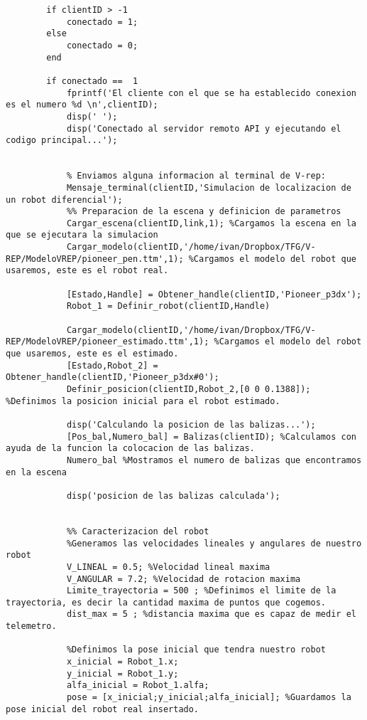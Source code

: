 \begin{lstlisting}[frame=single]
        %Comprobamos si estamos conectados a V-REP
        if clientID > -1 
            conectado = 1;
        else 
            conectado = 0;
        end

        if conectado ==  1
            fprintf('El cliente con el que se ha establecido conexion es el numero %d \n',clientID);
            disp(' ');
            disp('Conectado al servidor remoto API y ejecutando el codigo principal...');
            	

            % Enviamos alguna informacion al terminal de V-rep:
            Mensaje_terminal(clientID,'Simulacion de localizacion de un robot diferencial');
            %% Preparacion de la escena y definicion de parametros
            Cargar_escena(clientID,link,1); %Cargamos la escena en la que se ejecutara la simulacion
            Cargar_modelo(clientID,'/home/ivan/Dropbox/TFG/V-REP/ModeloVREP/pioneer_pen.ttm',1); %Cargamos el modelo del robot que usaremos, este es el robot real.
            
            [Estado,Handle] = Obtener_handle(clientID,'Pioneer_p3dx');
            Robot_1 = Definir_robot(clientID,Handle)
            
            Cargar_modelo(clientID,'/home/ivan/Dropbox/TFG/V-REP/ModeloVREP/pioneer_estimado.ttm',1); %Cargamos el modelo del robot que usaremos, este es el estimado.
            [Estado,Robot_2] = Obtener_handle(clientID,'Pioneer_p3dx#0');
            Definir_posicion(clientID,Robot_2,[0 0 0.1388]); %Definimos la posicion inicial para el robot estimado.
            
            disp('Calculando la posicion de las balizas...');
            [Pos_bal,Numero_bal] = Balizas(clientID); %Calculamos con ayuda de la funcion la colocacion de las balizas.
            Numero_bal %Mostramos el numero de balizas que encontramos en la escena 
            
            disp('posicion de las balizas calculada');
            

            %% Caracterizacion del robot
            %Generamos las velocidades lineales y angulares de nuestro robot
            V_LINEAL = 0.5; %Velocidad lineal maxima
            V_ANGULAR = 7.2; %Velocidad de rotacion maxima
            Limite_trayectoria = 500 ; %Definimos el limite de la trayectoria, es decir la cantidad maxima de puntos que cogemos.
            dist_max = 5 ; %distancia maxima que es capaz de medir el telemetro.

            %Definimos la pose inicial que tendra nuestro robot
            x_inicial = Robot_1.x;
            y_inicial = Robot_1.y;
            alfa_inicial = Robot_1.alfa;
            pose = [x_inicial;y_inicial;alfa_inicial]; %Guardamos la pose inicial del robot real insertado.



\end{lstlisting}
